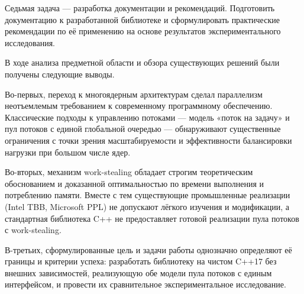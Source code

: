 Седьмая задача --- разработка документации и рекомендаций.
Подготовить документацию к разработанной библиотеке и
сформулировать практические рекомендации по её применению
на основе результатов экспериментального исследования.

В ходе анализа предметной области и обзора существующих решений
были получены следующие выводы.

Во-первых, переход к многоядерным архитектурам сделал параллелизм
неотъемлемым требованием к современному программному обеспечению.
Классические подходы к управлению потоками --- модель «поток на
задачу» и пул потоков с единой глобальной очередью --- обнаруживают
существенные ограничения с точки зрения масштабируемости
и эффективности балансировки нагрузки при большом числе ядер.

Во-вторых, механизм work-stealing обладает строгим теоретическим
обоснованием и доказанной оптимальностью по времени выполнения
и потреблению памяти. Вместе с тем существующие промышленные
реализации (Intel TBB, Microsoft PPL) не допускают лёгкого изучения
и модификации, а стандартная библиотека C++ не предоставляет
готовой реализации пула потоков с work-stealing.

В-третьих, сформулированные цель и задачи работы однозначно
определяют её границы и критерии успеха: разработать библиотеку
на чистом C++17 без внешних зависимостей, реализующую обе
модели пула потоков с единым интерфейсом, и провести их
сравнительное экспериментальное исследование.